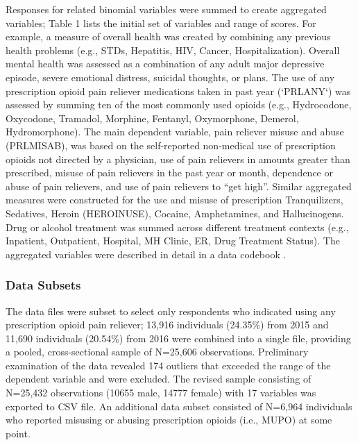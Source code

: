 \documentclass[sigconf]{acmart}
\begin{document}
Responses for related binomial variables were summed to create aggregated 
variables; Table 1 lists the initial set of variables and range of scores. 
For example, a measure of overall health was created by combining any previous 
health problems (e.g., STDs, Hepatitis, HIV, Cancer, Hospitalization). Overall 
mental health was assessed as a combination of any adult major depressive 
episode, severe emotional distress, suicidal thoughts, or plans. The use of any 
prescription opioid pain reliever medications taken in past year (`PRLANY`) was 
assessed by summing ten of the most commonly used opioids (e.g., Hydrocodone, 
Oxycodone, Tramadol, Morphine, Fentanyl, Oxymorphone, Demerol, Hydromorphone). 
The main dependent variable, pain reliever misuse and abuse (PRLMISAB), was 
based on the self-reported non-medical use of prescription opioids not directed 
by a physician, use of pain relievers in amounts greater than prescribed, misuse 
of pain relievers in the past year or month, dependence or abuse of pain 
relievers, and use of pain relievers to ``get high''. Similar aggregated measures 
were constructed for the use and misuse of prescription Tranquilizers, Sedatives, 
Heroin (HEROINUSE), Cocaine, Amphetamines, and Hallucinogens. Drug or alcohol 
treatment was summed across different treatment contexts (e.g., Inpatient, 
Outpatient, Hospital, MH Clinic, ER, Drug Treatment Status). The aggregated 
variables were described in detail in a data codebook . 


\subsubsection{Data Subsets} 
 
The data files were subset to select only respondents who indicated using
any prescription opioid pain reliever; 13,916 individuals (24.35\%) from 2015 
and 11,690 individuals (20.54\%) from 2016 were combined into a single file, 
providing a pooled, cross-sectional sample of N=25,606 observations. Preliminary 
examination of the data revealed 174 outliers that exceeded the range of the 
dependent variable and were excluded. The revised sample consisting of N=25,432 
observations (10655 male, 14777 female) with 17 variables was exported to CSV 
file. An additional data subset consisted of N=6,964 individuals who reported 
misusing or abusing prescription opioids (i.e., MUPO) at some point. 
\end{document}
